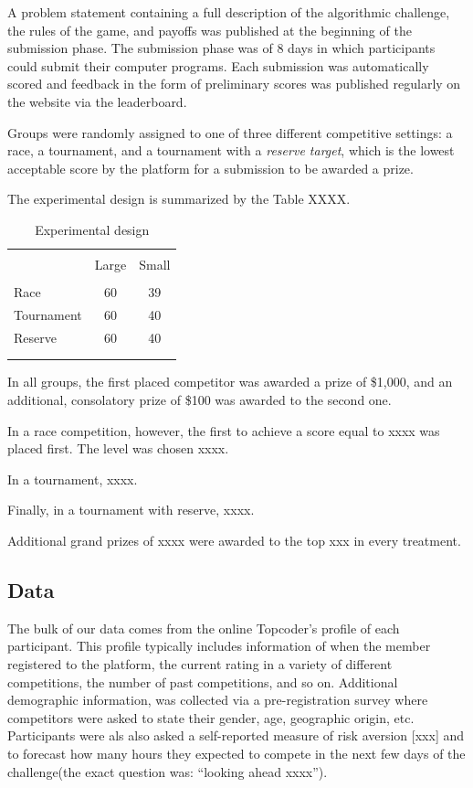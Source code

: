\documentclass[12pt,]{article}
\theoremstyle{plain} %
\begin{document}
A problem statement containing a full description of the algorithmic
challenge, the rules of the game, and payoffs was published at the
beginning of the submission phase. The submission phase was of 8 days in
which participants could submit their computer programs. Each submission
was automatically scored and feedback in the form of preliminary scores
was published regularly on the website via the leaderboard.

Groups were randomly assigned to one of three different competitive
settings: a race, a tournament, and a tournament with a \emph{reserve
target}, which is the lowest acceptable score by the platform for a
submission to be awarded a prize.

The experimental design is summarized by the Table XXXX.

\begin{table}
\centering
\caption{Experimental design}
\label{tab: experimental design}
\begin{tabular}{@{}lcc}
  \\[-1.8ex]\hline \hline \\[-1.8ex]
 & Large & Small \\ 
  \hline \\[-1.86ex]
Race & 60 & 39 \\ 
  Tournament & 60 & 40 \\ 
  Reserve & 60 & 40 \\ 
   \\[-1.8ex]\hline \hline \\[-1.8ex]
\end{tabular}
\end{table}

In all groups, the first placed competitor was awarded a prize of
\$1,000, and an additional, consolatory prize of \$100 was awarded to
the second one.

In a race competition, however, the first to achieve a score equal to
xxxx was placed first. The level was chosen xxxx.

In a tournament, xxxx.

Finally, in a tournament with reserve, xxxx.

Additional grand prizes of xxxx were awarded to the top xxx in every
treatment.

\subsection{Data}\label{data}

The bulk of our data comes from the online Topcoder's profile of each
participant. This profile typically includes information of when the
member registered to the platform, the current rating in a variety of
different competitions, the number of past competitions, and so on.
Additional demographic information, was collected via a pre-registration
survey where competitors were asked to state their gender, age,
geographic origin, etc. Participants were als also asked a self-reported
measure of risk aversion {[}xxx{]} and to forecast how many hours they
expected to compete in the next few days of the challenge(the exact
question was: ``looking ahead xxxx'').
\end{document}
